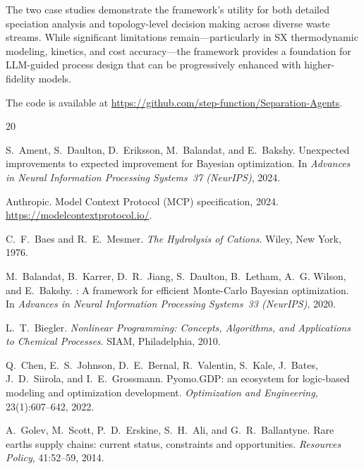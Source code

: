 \documentclass[11pt]{article}
\begin{document}
The two case studies demonstrate the framework's utility for both
detailed speciation analysis and topology-level decision making across
diverse waste streams.  While significant limitations remain---particularly
in SX thermodynamic modeling, kinetics, and cost accuracy---the
framework provides a foundation for LLM-guided process design that can
be progressively enhanced with higher-fidelity models.

The code is available at
\url{https://github.com/step-function/Separation-Agents}.


\begin{thebibliography}{20}

S.~Ament, S.~Daulton, D.~Eriksson, M.~Balandat, and E.~Bakshy.
\newblock Unexpected improvements to expected improvement for {B}ayesian
  optimization.
\newblock In \emph{Advances in Neural Information Processing Systems~37
  (NeurIPS)}, 2024.

Anthropic.
\newblock Model {C}ontext {P}rotocol ({MCP}) specification, 2024.
\newblock \url{https://modelcontextprotocol.io/}.

C.~F.~Baes and R.~E.~Mesmer.
\newblock \emph{The Hydrolysis of Cations}.
\newblock Wiley, New York, 1976.

M.~Balandat, B.~Karrer, D.~R.~Jiang, S.~Daulton, B.~Letham, A.~G.
  Wilson, and E.~Bakshy.
: A framework for efficient {M}onte-{C}arlo {B}ayesian
  optimization.
\newblock In \emph{Advances in Neural Information Processing Systems~33
  (NeurIPS)}, 2020.

L.~T.~Biegler.
\newblock \emph{Nonlinear Programming: Concepts, Algorithms, and
  Applications to Chemical Processes}.
\newblock SIAM, Philadelphia, 2010.

Q.~Chen, E.~S.~Johnson, D.~E.~Bernal, R.~Valentin, S.~Kale,
  J.~Bates, J.~D.~Siirola, and I.~E.~Grossmann.
\newblock Pyomo.{GDP}: an ecosystem for logic-based modeling and
  optimization development.
\newblock \emph{Optimization and Engineering}, 23(1):607--642, 2022.

A.~Golev, M.~Scott, P.~D.~Erskine, S.~H.~Ali, and G.~R.~Ballantyne.
\newblock Rare earths supply chains: current status, constraints and
  opportunities.
\newblock \emph{Resources Policy}, 41:52--59, 2014.


\end{thebibliography}
\end{document}
